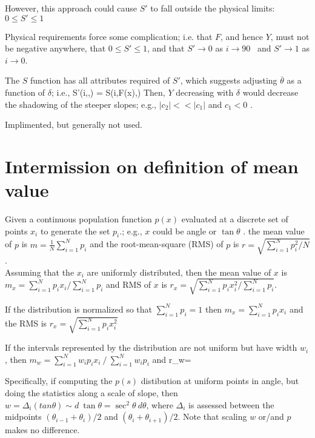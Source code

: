 \documentclass{article}
\begin{document}
However, this approach could cause $S'$ to fall outside the physical limits: $ 0
\leq S' \leq 1$

Physical requirements force some complication; i.e. that $F$, and hence $Y$,
must not be negative anywhere, that $ 0 \leq S' \leq 1$, and that $S'
\rightarrow 0$ as $i \rightarrow 90$\qd~ and $S' \rightarrow 1$ as $i
\rightarrow 0$.

 The $S$ function has all attributes required of $S'$, which suggests adjusting
 $\overline{\theta}$ as a function of $\delta$; i.e., \qbn
 S'(i,\overline{\theta},\delta) = S(i,F(x)\overline{\theta},\delta) \qen Then,
 $Y$ decreasing with $\delta$ would decrease the shadowing of the steeper
 slopes; e.g., $|c_2| << |c_1| $ and $c_1 < 0$ .

Implimented, but generally not used.

\section{Intermission on definition of mean value}

Given a continuous population function $p(x)$ evaluated at a discrete set of points $x_i$ to generate the set $p_i$.; e.g., $x$ could be angle or $\tan \theta$ .
\qi the mean value of $p$ is $ m=\frac{1}{N} \sum_{i=1}^N p_i $ and
 the root-mean-square (RMS) of $p$ is $ r=\sqrt{ \sum_{i=1}^N p_i^2 \big/ N }$.
\\ Assuming that the $x_i$ are uniformly distributed, then
\qi the mean value of $x$ is $ m_x=\sum_{i=1}^N p_i x_i \big/ \sum_{i=1}^N p_i $ 
and RMS of $x$ is 
$ r_x=\sqrt{ \sum_{i=1}^N p_i  x^2_i  \big/ \sum_{i=1}^N p_i }$.

If the distribution is normalized so that $\sum_{i=1}^N p_i =1$ 
 then  $ m_x=\sum_{i=1}^N p_i x_i $
 and the RMS is $ r_x=\sqrt{ \sum_{i=1}^N p_i x^2_i }$

\vspace{4.mm}

If the intervals represented by the distribution are not uniform but have width $w_i$, 
\qii then $ m_w=\sum_{i=1}^N w_ip_ix_i \ \big/ \ \sum_{i=1}^N w_ip_i$ and 
\qb r_w= \qe


Specifically, if computing the $p(s)$ distibution at uniform points in angle,
but doing the statistics along a scale of slope, then $w= \Delta_i (tan \theta)
\sim d \ \tan \theta = \sec ^2 \theta \ d \theta $, where $\Delta_i$ is assessed
between the midpoints $(\theta_{i-1}+ \theta_i )/2 $ and $(\theta_i +
\theta_{i+1} )/2 $. Note that scaling $w$ or/and $p$ makes no difference.
\end{document}
